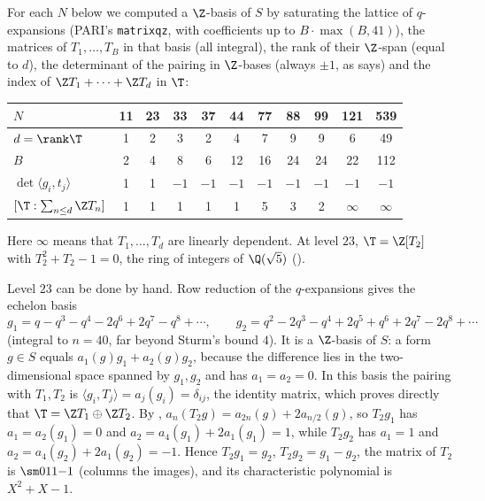 \begin{example}\label{ex:hecke:pairing-table}
For each $N$ below we computed a $\Z$-basis of $S$ by saturating the lattice of $q$-expansions (PARI's \texttt{matrixqz}, with coefficients up to $B\cdot\max(B,41)$), the
matrices of $T_1,\dots,T_B$ in that basis (all integral), the rank of their $\Z$-span (equal to $d$), the determinant of the pairing in $\Z$-bases (always $\pm1$, as
 says) and the index of $\Z T_1+\cdots+\Z T_d$ in $\T$:
\begin{center}
\begin{tabular}{lcccccccccc}
\toprule
$N$ & 11 & 23 & 33 & 37 & 44 & 77 & 88 & 99 & 121 & 539\\
\midrule
$d=\rank\T$ & 1 & 2 & 3 & 2 & 4 & 7 & 9 & 9 & 6 & 49\\
$B$ & 2 & 4 & 8 & 6 & 12 & 16 & 24 & 24 & 22 & 112\\
$\det\langle g_i,t_j\rangle$ & 1 & 1 & $-1$ & $-1$ & $-1$ & $-1$ & $-1$ & $-1$ & $-1$ & $-1$\\
$[\T:\sum_{n\le d}\Z T_n]$ & 1 & 1 & 1 & 1 & 1 & 5 & 3 & 2 & $\infty$ & $\infty$\\
\bottomrule
\end{tabular}
\end{center}
Here $\infty$ means that $T_1,\dots,T_d$ are linearly dependent. At level $23$, $\T=\Z[T_2]$ with $T_2^2+T_2-1=0$, the ring of integers of $\Q(\sqrt5)$ ().

Level $23$ can be done by hand. Row reduction of the $q$-expansions gives the echelon basis
\[
g_1=q-q^3-q^4-2q^6+2q^7-q^8+\cdots,\qquad g_2=q^2-2q^3-q^4+2q^5+q^6+2q^7-2q^8+\cdots
\]
(integral to $n=40$, far beyond Sturm's bound $4$). It is a $\Z$-basis of $S$: a form $g\in S$ equals $a_1(g)g_1+a_2(g)g_2$, because the difference lies in the
two-dimensional space spanned by $g_1,g_2$ and has $a_1=a_2=0$. In this basis the pairing with $T_1,T_2$ is $\langle g_i,T_j\rangle=a_j(g_i)=\delta_{ij}$, the identity matrix, which
proves directly that $\T=\Z T_1\oplus\Z T_2$. By , $a_n(T_2g)=a_{2n}(g)+2a_{n/2}(g)$, so $T_2g_1$ has $a_1=a_2(g_1)=0$ and $a_2=a_4(g_1)+2a_1(g_1)=1$,
while $T_2g_2$ has $a_1=1$ and $a_2=a_4(g_2)+2a_1(g_2)=-1$. Hence $T_2g_1=g_2$, $T_2g_2=g_1-g_2$, the matrix of $T_2$ is $\sm011{-1}$ (columns the images), and its
characteristic polynomial is $X^2+X-1$.
\end{example}

